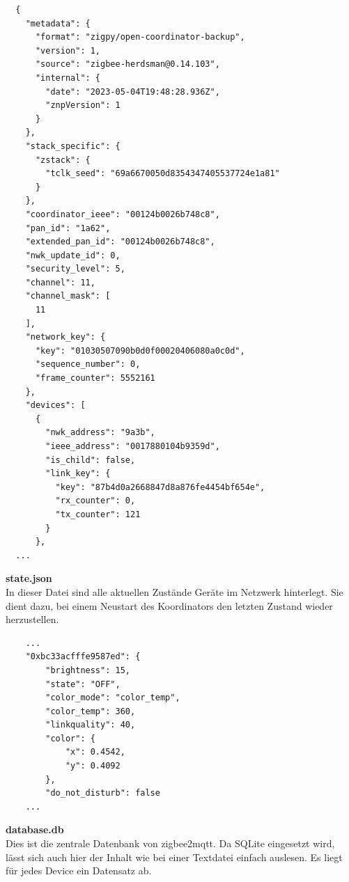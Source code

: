 \begin{lstlisting}
  {
    "metadata": {
      "format": "zigpy/open-coordinator-backup",
      "version": 1,
      "source": "zigbee-herdsman@0.14.103",
      "internal": {
        "date": "2023-05-04T19:48:28.936Z",
        "znpVersion": 1
      }
    },
    "stack_specific": {
      "zstack": {
        "tclk_seed": "69a6670050d8354347405537724e1a81"
      }
    },
    "coordinator_ieee": "00124b0026b748c8",
    "pan_id": "1a62",
    "extended_pan_id": "00124b0026b748c8",
    "nwk_update_id": 0,
    "security_level": 5,
    "channel": 11,
    "channel_mask": [
      11
    ],
    "network_key": {
      "key": "01030507090b0d0f00020406080a0c0d",
      "sequence_number": 0,
      "frame_counter": 5552161
    },
    "devices": [
      {
        "nwk_address": "9a3b",
        "ieee_address": "0017880104b9359d",
        "is_child": false,
        "link_key": {
          "key": "87b4d0a2668847d8a876fe4454bf654e",
          "rx_counter": 0,
          "tx_counter": 121
        }
      },
  ...  
  \end{lstlisting}

  \textbf{state.json}\\

  In dieser Datei sind alle aktuellen Zustände Geräte im Netzwerk hinterlegt. Sie dient dazu, bei einem Neustart des Koordinators den letzten Zustand wieder herzustellen.

  \begin{lstlisting}
    ...
    "0xbc33acfffe9587ed": {
        "brightness": 15,
        "state": "OFF",
        "color_mode": "color_temp",
        "color_temp": 360,
        "linkquality": 40,
        "color": {
            "x": 0.4542,
            "y": 0.4092
        },
        "do_not_disturb": false
    ...
  \end{lstlisting}
  \textbf{database.db}\\

  Dies ist die zentrale Datenbank von zigbee2mqtt. Da SQLite eingesetzt wird, lässt sich auch hier der Inhalt wie bei einer Textdatei einfach auslesen.
  Es liegt für jedes Device ein Datensatz ab.

